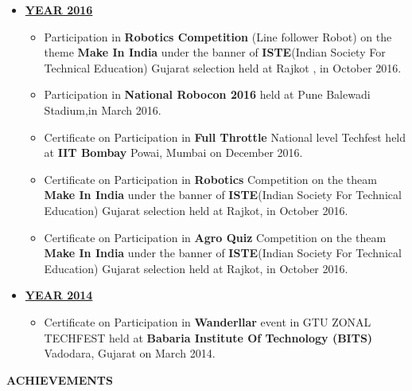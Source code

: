 \documentclass[a4paper,10pt]{article}
\newcommand{\isep}{-2 pt}
\newcommand{\resheading}[1]{{\small \colorbox{mygrey}{\begin{minipage}{0.975\textwidth}{\textbf{#1 \vphantom{p\^{E}}}}\end{minipage}}}}
\begin{document}
\begin{itemize}
    \item \underline{\textbf{YEAR 2016}}
    \begin{itemize}
    
    \item \noindent Participation in \textbf{ Robotics Competition }(Line follower Robot) on the theme \textbf{ Make In India } under the banner of \textbf{ISTE}(Indian Society For Technical Education) Gujarat selection held at Rajkot , in October 2016.
    \item \noindent Participation in \textbf{National Robocon 2016} held at Pune Balewadi Stadium,in March 2016.
    \item \noindent Certificate on Participation in \textbf{ Full Throttle } National level Techfest held at \textbf{IIT Bombay } Powai, Mumbai on December 2016.
    \item \noindent Certificate on Participation in \textbf{ Robotics } Competition on the theam \textbf{Make In India} under the banner of \textbf{ISTE}(Indian Society For Technical Education) Gujarat selection held at Rajkot, in October 2016.
    \item \noindent Certificate on Participation in \textbf{ Agro Quiz } Competition on the theam \textbf{Make In India} under the banner of \textbf{ISTE}(Indian Society For Technical Education) Gujarat selection held at Rajkot, in October 2016.
    \end{itemize}
    
    \item \underline{ \textbf{YEAR 2014}}
    \begin{itemize}
    
    
    \item \noindent Certificate on Participation in \textbf{ Wanderllar} event in GTU ZONAL TECHFEST held at \textbf{Babaria Institute Of Technology (BITS) } Vadodara, Gujarat on March 2014.
    \end{itemize}
    
\end{itemize}

\resheading{\textbf{ACHIEVEMENTS}  }\\ [\isep]
\end{document}
